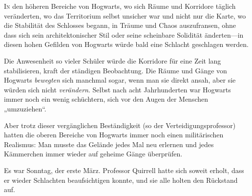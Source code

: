 
\lettrine{I}{n} den höheren Bereiche von Hogwarts, wo sich Räume und Korridore täglich veränderten, wo das Territorium selbst unsicher war und nicht nur die Karte, wo die Stabilität des Schlosses begann, in Träume und Chaos auszufransen, ohne dass sich sein architektonischer Stil oder seine scheinbare Solidität änderten—in diesen hohen Gefilden von Hogwarts würde bald eine Schlacht geschlagen werden.

Die Anwesenheit so vieler Schüler würde die Korridore für eine Zeit lang stabilisieren, kraft der ständigen Beobachtung. Die Räume und Gänge von Hogwarts \emph{bewegten} sich manchmal sogar, wenn man sie direkt ansah, aber sie würden sich nicht \emph{verändern}. Selbst nach acht Jahrhunderten war Hogwarts immer noch ein wenig schüchtern, sich vor den Augen der Menschen „umzuziehen“.

Aber trotz dieser vergänglichen Beständigkeit (so der Verteidigungsprofessor) hatten die oberen Bereiche von Hogwarts immer noch einen militärischen Realismus: Man musste das Gelände jedes Mal neu erlernen und jedes Kämmerchen immer wieder auf geheime Gänge überprüfen.

Es war Sonntag, der erste März. Professor Quirrell hatte sich soweit erholt, dass er wieder Schlachten beaufsichtigen konnte, und sie alle holten den Rückstand auf.

